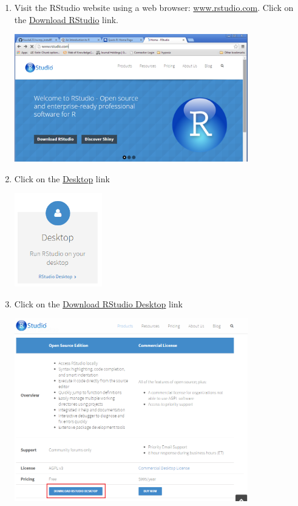\documentclass[letterpaper,12pt]{article}\usepackage[]{graphicx}\usepackage[]{color}
\begin{document}
\begin{enumerate}

\item{Visit the RStudio website using a web browser: \href{http://www.rstudio.com}{www.rstudio.com}.  Click on the \href{http://www.rstudio.com/products/RStudio/}{Download RStudio} link.}

\includegraphics[width=0.8\textwidth]{figs/rstudio.png}

\item{Click on the \href{http://www.rstudio.com/products/RStudio/#Desk}{Desktop} link}

\includegraphics[width=0.3\textwidth]{figs/desktop.png}

\item{Click on the \href{http://www.rstudio.com/products/rstudio/download/}{Download RStudio Desktop} link}

\includegraphics[width=0.8\textwidth]{figs/downloadrstudio.png}


\end{enumerate}
\end{document}
